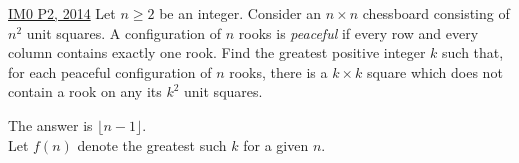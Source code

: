 \begin{problem}{8}{\href{}{IM0 P2, 2014}}
	Let $n\ge 2$ be an integer. Consider an $n\times n$ chessboard consisting of $n^2$ unit squares. A configuration of $n$ rooks is \emph{peaceful} if every row and every column contains exactly one rook. Find the greatest positive integer $k$ such that, for each peaceful configuration of $n$ rooks, there is a $k\times k$ square which does not contain a rook on any its $k^2$ unit squares.
	\begin{solution} The answer is $\lfloor n-1\rfloor$.\\
	Let $f(n)$ denote the greatest such $k$ for a given $n$.
	\end{solution}
\end{problem}
